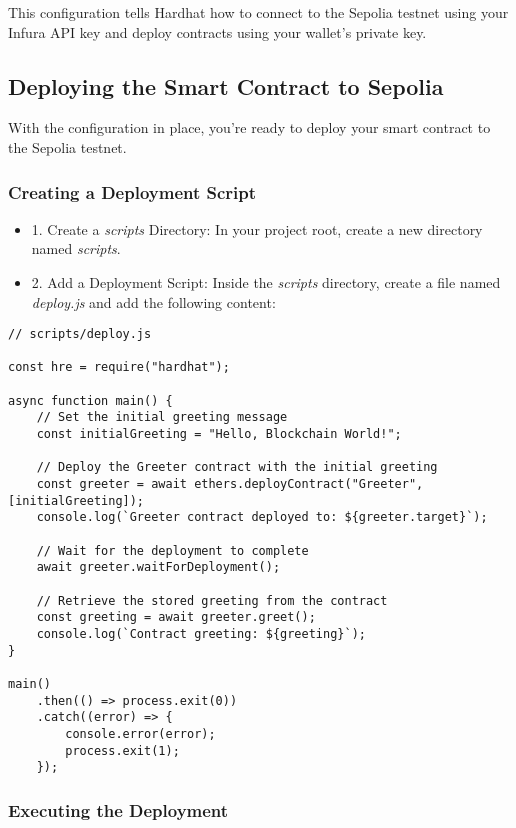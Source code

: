 \documentclass[12pt]{article}
\begin{document}
This configuration tells Hardhat how to connect to the Sepolia testnet using your Infura API key and deploy contracts using your wallet's private key.

\subsection{Deploying the Smart Contract to Sepolia}

With the configuration in place, you're ready to deploy your smart contract to the Sepolia testnet.

\subsubsection{Creating a Deployment Script}

\begin{itemize}
\item 1. Create a \textit{scripts} Directory: In your project root, create a new directory named \textit{scripts}.

\item 2. Add a Deployment Script: Inside the \textit{scripts} directory, create a file named \textit{deploy.js} and add the following content:
\end{itemize}

\begin{verbatim}
// scripts/deploy.js

const hre = require("hardhat");

async function main() {
    // Set the initial greeting message
    const initialGreeting = "Hello, Blockchain World!";
    
    // Deploy the Greeter contract with the initial greeting
    const greeter = await ethers.deployContract("Greeter", [initialGreeting]);
    console.log(`Greeter contract deployed to: ${greeter.target}`);

    // Wait for the deployment to complete
    await greeter.waitForDeployment();

    // Retrieve the stored greeting from the contract
    const greeting = await greeter.greet();
    console.log(`Contract greeting: ${greeting}`);
}

main()
    .then(() => process.exit(0))
    .catch((error) => {
        console.error(error);
        process.exit(1);
    });
\end{verbatim}

\subsubsection{Executing the Deployment}
\end{document}
